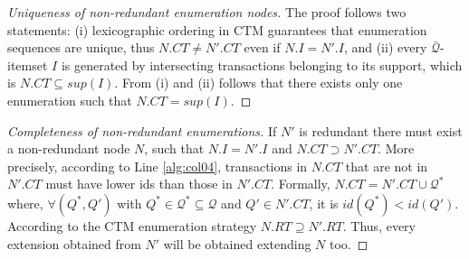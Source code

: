 \documentclass[preprint,12pt,authoryear]{elsarticle} %
\newtheorem{proof}{Proof}
\begin{document}
\begin{proof}[Uniqueness of non-redundant enumeration nodes]\label{ap:t2}
The proof follows two statements: (i) lexicographic ordering in CTM guarantees that enumeration sequences are unique, thus  $N.CT \neq N'.CT$ even if $N.I=N'.I$, and (ii) every $\bar{\mathcal{Q}}$-itemset $I$ is generated by intersecting transactions belonging to its support, which is $N.CT \subseteq sup(I)$.
From (i) and (ii) follows that there exists only one enumeration such that $N.CT = sup(I)$.
\end{proof}

\begin{proof}[Completeness of non-redundant enumerations]\label{ap:t3}
If $N'$ is redundant there must exist a non-redundant node $N$, such that $N.I=N'.I$ and  $N.CT \supset N'.CT$.
More precisely, according to  Line \ref{alg:col04}, transactions in $N.CT$ that are not in $N'.CT$ must have lower ids than those in $N'.CT$.
Formally, $N.CT = N'.CT \cup \mathcal{Q}^*$ where, $ \forall (Q^*,Q')$ with $Q^* \in \mathcal{Q}^* \subseteq \mathcal{Q}$ and $Q' \in N'.CT$, it is $id(Q^*)<id(Q')$.
According to the CTM enumeration strategy $N.RT \supseteq N'.RT$.
Thus, every extension obtained from $N'$ will be obtained extending $N$ too.
\end{proof}

\balance


\end{document}

